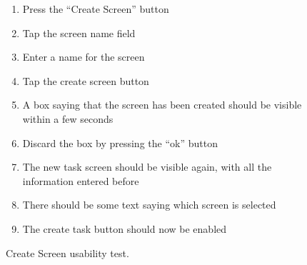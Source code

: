 \begin{figure}[H]
    \begin{enumerate}
        \item Press the “Create Screen” button
        \item Tap the screen name field
        \item Enter a name for the screen
        \item Tap the create screen button
        \item A box saying that the screen has been created should be visible within a few seconds
        \item Discard the box by pressing the “ok” button
        \item The new task screen should be visible again, with all the information entered before
        \item There should be some text saying which screen is selected
        \item The create task button should now be enabled
    \end{enumerate}
    \caption{Create Screen usability test.}
    \label{createScreenUsabilityTest}

\end{figure}
